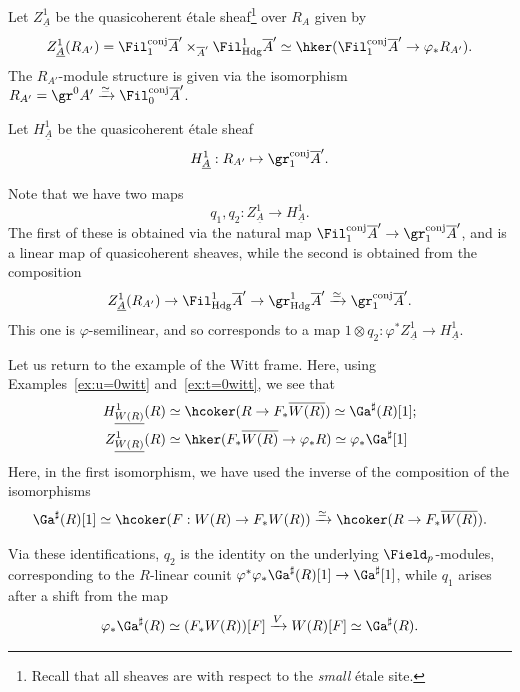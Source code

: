 \documentclass[10pt]{amsart}
\begin{document}
\begin{construction}
Let $Z^1_{\underline{A}}$ be the quasicoherent \'etale sheaf\footnote{Recall that all sheaves are with respect to the \emph{small} \'etale site.} over $R_A$ given by
\[
Z^1_{\underline{A}}(R_{A'}) = \Fil_1^{\mathrm{conj}}\overline{A}'\times_{\overline{A}'}\Fil^1_{\mathrm{Hdg}}\overline{A}' \simeq \hker(\Fil_1^{\mathrm{conj}}\overline{A}'\to \varphi_*R_{A'}).
\]
The $R_{A'}$-module structure is given via the isomorphism $R_{A'}=\gr^0A'\xrightarrow{\simeq}\Fil^{\mathrm{conj}}_0\overline{A}'$.

Let $H^1_{\underline{A}}$ be the quasicoherent \'etale sheaf
\[
H^1_{\underline{A}}:R_{A'}\mapsto \gr^{\mathrm{conj}}_1\overline{A}'.
\]

Note that we have two maps
\[
q_1,q_2:Z^1_{\underline{A}}\to H^1_{\underline{A}}.
\]
The first of these is obtained via the natural map $\Fil_1^{\mathrm{conj}}\overline{A}'\to \gr^{\mathrm{conj}}_1\overline{A}'$, and is a linear map of quasicoherent sheaves, while the second is obtained from the composition
\[
Z^1_{\underline{A}}(R_{A'})\to \Fil^{1}_{\mathrm{Hdg}}\overline{A}'\to \gr^1_{\mathrm{Hdg}}\overline{A}'\xrightarrow{\simeq}\gr^{\mathrm{conj}}_1\overline{A}'.
\]
This one is $\varphi$-semilinear, and so corresponds to a map $1\otimes q_2:\varphi^*Z^1_{\underline{A}}\to H^1_{\underline{A}}$.
\end{construction}


\begin{example}
\label{ex:z1h1_witt}
Let us return to the example of the Witt frame. Here, using Examples~\ref{ex:u=0witt} and~\ref{ex:t=0witt}, we see that 
\begin{align*}
H^1_{\underline{W(R)}}(R)&\simeq \hcoker(R\to F_*\overline{W(R)})\simeq \Ga^\sharp(R)[1];\\
Z^1_{\underline{W(R)}}(R)&\simeq\hker(F_*\overline{W(R)}\to \varphi_*R)\simeq \varphi_*\Ga^{\sharp}[1]
\end{align*}
Here, in the first isomorphism, we have used the inverse of the composition of the isomorphisms
\[
\Ga^\sharp(R)[1]\simeq \hcoker(F:W(R)\to F_*W(R))\xrightarrow{\simeq}\hcoker(R\to F_*\overline{W(R)}).
\]

Via these identifications, $q_2$ is the identity on the underlying $\Field_p$-modules, corresponding to the $R$-linear counit $\varphi^*\varphi_*\Ga^\sharp(R)[1]\to \Ga^\sharp[1]$, while  $q_1$ arises after a shift from the map
\[
\varphi_*\Ga^\sharp(R)\simeq (F_*W(R))[F]\xrightarrow{V} W(R)[F]\simeq \Ga^\sharp(R). 
\] 
\end{example}
\end{document}
